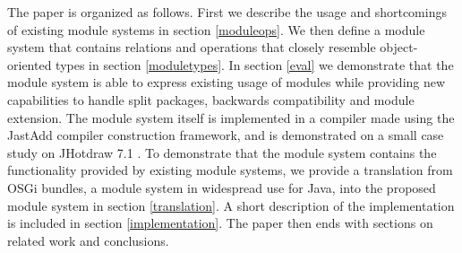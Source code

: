 




%

The paper is organized as follows. First we describe the
usage and shortcomings of existing module systems in section \ref{moduleops}. 
We then define a module system that contains relations and operations 
that closely resemble object-oriented types in section \ref{moduletypes}. 
In section \ref{eval} we demonstrate that the module
system is able to express existing usage of modules while providing new
capabilities to handle split packages, backwards compatibility and module extension. The module system
itself is implemented in a compiler made using the JastAdd\cite{jastadd} compiler construction
framework, and is demonstrated on a small case study on JHotdraw 7.1 \cite{jhotdraw}.
To demonstrate that the module system contains the functionality provided by existing
module systems, we provide a translation from OSGi bundles, a module system in widespread
use for Java, into the proposed module system in section \ref{translation}.
A short description of the implementation is included in section \ref{implementation}.
The paper then ends with sections on related work and conclusions.
